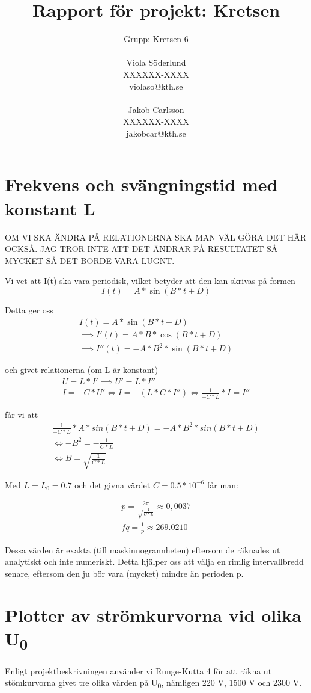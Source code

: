 \documentclass[a4paper, titlepage, 11pt]{article}
\title{Rapport för projekt: Kretsen}
\author{Grupp: Kretsen 6 \\ \\
Viola Söderlund \\ XXXXXX-XXXX \\ violaso@kth.se \\ \\
Jakob Carlsson \\ XXXXXX-XXXX \\ jakobcar@kth.se}
\begin{document}
\maketitle

\section{Frekvens och svängningstid med konstant L}

OM VI SKA ÄNDRA PÅ RELATIONERNA SKA MAN VÄL GÖRA DET HÄR OCKSÅ. JAG TROR INTE ATT DET ÄNDRAR PÅ RESULTATET SÅ MYCKET SÅ DET BORDE VARA LUGNT.

Vi vet att I(t) ska vara periodisk, vilket betyder att den kan skrivas på formen
$$I(t) = A*\sin(B*t + D)$$

Detta ger oss
\begin{gather*}
    I(t) = A*\sin(B*t + D) \\
    \implies I'(t) = A*B*\cos(B*t + D) \\
    \implies I''(t) = -A*B^2*\sin(B*t + D)
\end{gather*}

och givet relationerna (om L är konstant)
\begin{gather}
    U = L*I' \implies U' = L*I'' \\ %
    I = -C*U' \iff I = -(L*C*I'') \iff \frac{1}{-C*L} * I = I''
\end{gather}

får vi att
\begin{gather*}
    \frac{1}{-C*L} * A*sin(B*t + D) = -A*B^2*sin(B*t + D) \\
    \iff -B^2 = -\frac{1}{C*L} \\
    \iff B = \sqrt{\frac{1}{C*L}}
\end{gather*}

Med $L = L_0 = 0.7$ och det givna värdet $C = 0.5*10^{-6}$ får man:

\begin{gather*}
    p = \frac{2\pi}{\sqrt{\frac{1}{C*L}}} \approx 0,0037 \\
    fq = \frac{1}{p} \approx 269.0210
\end{gather*}

Dessa värden är exakta (till maskinnogrannheten) eftersom de räknades ut analytiskt och inte numeriskt. Detta hjälper oss att välja en rimlig intervallbredd senare, eftersom den ju bör vara (mycket) mindre än perioden p.


\section{Plotter av strömkurvorna vid olika U\textsubscript{0}}
Enligt projektbeskrivningen använder vi Runge-Kutta 4 för att räkna ut stömkurvorna givet tre olika värden på U\textsubscript{0}, nämligen 220 V, 1500 V och 2300 V.
\end{document}
